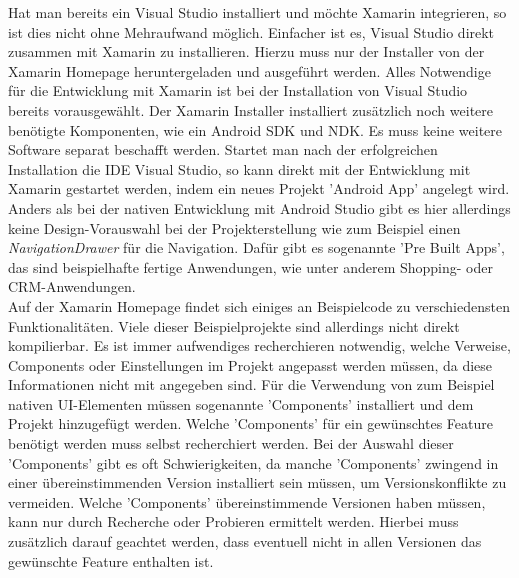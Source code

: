 Hat man bereits ein Visual Studio installiert und möchte Xamarin integrieren, so ist dies nicht ohne Mehraufwand möglich. Einfacher ist es, Visual Studio direkt zusammen mit Xamarin zu installieren. Hierzu muss nur der Installer von der Xamarin Homepage heruntergeladen und ausgeführt werden. Alles Notwendige für die Entwicklung mit Xamarin ist bei der Installation von Visual Studio bereits vorausgewählt. Der Xamarin Installer installiert zusätzlich noch weitere benötigte Komponenten, wie ein Android SDK und NDK. Es muss keine weitere Software separat beschafft werden. Startet man nach der erfolgreichen Installation die IDE Visual Studio, so kann direkt mit der Entwicklung mit Xamarin gestartet werden, indem ein neues Projekt 'Android App' angelegt wird. Anders als bei der nativen Entwicklung mit Android Studio gibt es hier allerdings keine Design-Vorauswahl bei der Projekterstellung wie zum Beispiel einen \textit{NavigationDrawer} für die Navigation. Dafür gibt es sogenannte 'Pre Built Apps', das sind beispielhafte fertige Anwendungen, wie unter anderem Shopping- oder CRM-Anwendungen. 
\\
Auf der Xamarin Homepage findet sich einiges an Beispielcode zu verschiedensten Funktionalitäten. Viele dieser Beispielprojekte sind allerdings nicht direkt kompilierbar. Es ist immer aufwendiges recherchieren notwendig, welche Verweise, Components oder Einstellungen im Projekt angepasst werden müssen, da diese Informationen nicht mit angegeben sind. Für die Verwendung von zum Beispiel nativen UI-Elementen müssen sogenannte 'Components' installiert und dem Projekt hinzugefügt werden. Welche 'Components' für ein gewünschtes Feature benötigt werden muss selbst recherchiert werden. Bei der Auswahl dieser 'Components' gibt es oft Schwierigkeiten, da manche 'Components' zwingend in einer übereinstimmenden Version installiert sein müssen, um Versionskonflikte zu vermeiden. Welche 'Components' übereinstimmende Versionen haben müssen, kann nur durch Recherche oder Probieren ermittelt werden. Hierbei muss zusätzlich darauf geachtet werden, dass eventuell nicht in allen Versionen das gewünschte Feature enthalten ist.
\\
